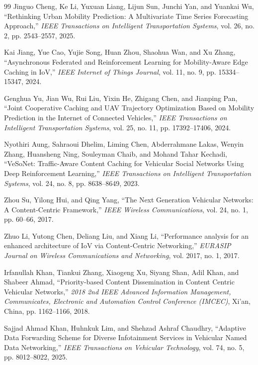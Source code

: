 \documentclass[journal]{IEEEtran}
\begin{document}
\begin{thebibliography}{99}
Jinguo Cheng, Ke Li, Yuxuan Liang, Lijun Sun, Junchi Yan, and Yuankai Wu, ``Rethinking Urban Mobility Prediction: A Multivariate Time Series Forecasting Approach,'' \emph{IEEE Transactions on Intelligent Transportation Systems}, vol. 26, no. 2, pp. 2543--2557, 2025.%

Kai Jiang, Yue Cao, Yujie Song, Huan Zhou, Shaohua Wan, and Xu Zhang, ``Asynchronous Federated and Reinforcement Learning for Mobility-Aware Edge Caching in IoV,'' \emph{IEEE Internet of Things Journal}, vol. 11, no. 9, pp. 15334--15347, 2024.%

Genghua Yu, Jian Wu, Rui Liu, Yixin He, Zhigang Chen, and Jianping Pan, ``Joint Cooperative Caching and UAV Trajectory Optimization Based on Mobility Prediction in the Internet of Connected Vehicles,'' \emph{IEEE Transactions on Intelligent Transportation Systems}, vol. 25, no. 11, pp. 17392--17406, 2024.%

Nyothiri Aung, Sahraoui Dhelim, Liming Chen, Abderrahmane Lakas, Wenyin Zhang, Huansheng Ning, Souleyman Chaib, and Mohand Tahar Kechadi, ``VeSoNet: Traffic-Aware Content Caching for Vehicular Social Networks Using Deep Reinforcement Learning,'' \emph{IEEE Transactions on Intelligent Transportation Systems}, vol. 24, no. 8, pp. 8638--8649, 2023.%

Zhou Su, Yilong Hui, and Qing Yang, ``The Next Generation Vehicular Networks: A Content-Centric Framework,'' \emph{IEEE Wireless Communications}, vol. 24, no. 1, pp. 60--66, 2017.%

Zhuo Li, Yutong Chen, Deliang Liu, and Xiang Li, ``Performance analysis for an enhanced architecture of IoV via Content-Centric Networking,'' \emph{EURASIP Journal on Wireless Communications and Networking}, vol. 2017, no. 1, 2017.%

Irfanullah Khan, Tiankui Zhang, Xiaogeng Xu, Siyang Shan, Adil Khan, and Shabeer Ahmad, ``Priority-based Content Dissemination in Content Centric Vehicular Networks,'' \emph{2018 2nd IEEE Advanced Information Management, Communicates, Electronic and Automation Control Conference (IMCEC)}, Xi'an, China, pp. 1162--1166, 2018.%

Sajjad Ahmad Khan, Huhnkuk Lim, and Shehzad Ashraf Chaudhry, ``Adaptive Data Forwarding Scheme for Diverse Infotainment Services in Vehicular Named Data Networking,'' \emph{IEEE Transactions on Vehicular Technology}, vol. 74, no. 5, pp. 8012--8022, 2025.%


\end{thebibliography}
\end{document}
